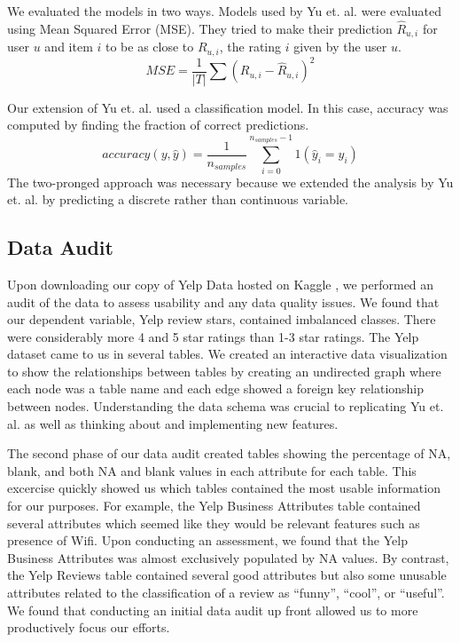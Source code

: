 \documentclass[12pt]{article}
\begin{document}
We evaluated the models in two ways. Models used by Yu et. al. \cite{yu2015restaurants}
were evaluated using Mean Squared Error (MSE). They tried to make their prediction $\hat{R}_{u,i}$
for user $u$ and item $i$ to be as close to $R_{u,i}$, the rating $i$ given by the user $u$.
\[
MSE = \frac{1}{|T|}\sum(R_{u,i} - \hat{R}_{u,i})^2
\]

Our extension of Yu et. al. \cite{yu2015restaurants} used a classification model. In this
case, accuracy was computed by finding the fraction of correct predictions.
\[
accuracy(y, \hat{y}) = \frac{1}{n_{samples}} \sum_{i=0}^{n_{samples} - 1} 1(\hat{y}_i = y_i)
\]
The two-pronged approach was necessary because we extended the analysis by Yu et. al.
\cite{yu2015restaurants} by predicting a discrete rather than continuous variable.

\subsection{Data Audit}

Upon downloading our copy of Yelp Data hosted on Kaggle \cite{YelpData59:online}, we performed
an audit of the data to assess usability and any data quality issues. We found that our
dependent variable, Yelp review stars, contained imbalanced classes. There were considerably
more 4 and 5 star ratings than 1-3 star ratings. The Yelp dataset came to us in several tables.
We created an interactive data visualization to show the relationships between tables by creating
an undirected graph where each node was a table name and each edge showed a foreign key
relationship between nodes. Understanding the data schema was crucial to replicating
Yu et. al. \cite{yu2015restaurants} as well as thinking about and implementing new features.

The second phase of our data audit created tables showing the percentage of NA, blank, and
both NA and blank values in each attribute for each table. This excercise quickly showed us
which tables contained the most usable information for our purposes. For example, the Yelp
Business Attributes table contained several attributes which seemed like they would be
relevant features such as presence of Wifi. Upon conducting an assessment, we found that
the Yelp Business Attributes was almost exclusively populated by NA values. By contrast, the
Yelp Reviews table contained several good attributes but also some unusable attributes
related to the classification of a review as ``funny'', ``cool'', or ``useful''. We found
that conducting an initial data audit up front allowed us to more productively focus our
efforts.
\end{document}
